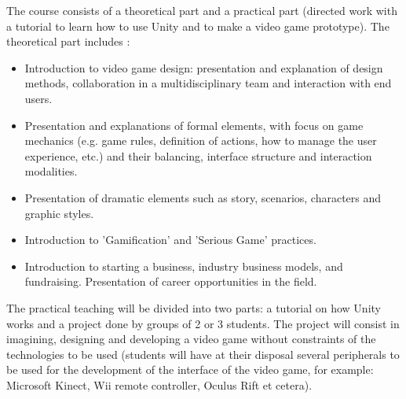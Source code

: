 The course consists of a theoretical part and a practical part (directed work with a tutorial to learn how to use Unity and to make a video game prototype). The theoretical part includes :
\begin{itemize}
    \item Introduction to video game design: presentation and explanation of design methods, collaboration in a multidisciplinary team and interaction with end users.
    \item Presentation and explanations of formal elements, with focus on game mechanics (e.g. game rules, definition of actions, how to manage the user experience, etc.) and their balancing, interface structure and interaction modalities.
    \item Presentation of dramatic elements such as story, scenarios, characters and graphic styles.
    \item Introduction to 'Gamification' and 'Serious Game' practices.
    \item Introduction to starting a business, industry business models, and fundraising. Presentation of career opportunities in the field.
\end{itemize}
The practical teaching will be divided into two parts: a tutorial on how Unity works and a project done by groups of 2 or 3 students. The project will consist in imagining, designing and developing a video game without constraints of the technologies to be used (students will have at their disposal several peripherals to be used for the development of the interface of the video game, for example: Microsoft Kinect, Wii remote controller, Oculus Rift et cetera).